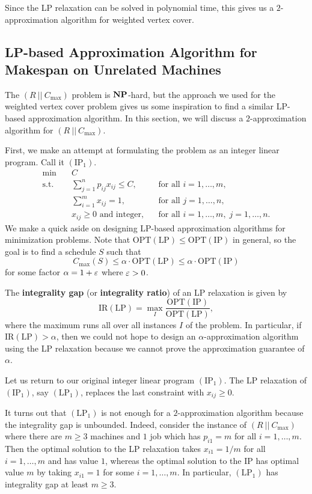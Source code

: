 Since the LP relaxation can be solved in polynomial time, this gives us a 
$2$-approximation algorithm for weighted vertex cover. 

\subsection{LP-based Approximation Algorithm for Makespan on Unrelated Machines}
\label{subsec:10.2}
The $(R~||~C_{\max})$ problem is $\operatorname{\textbf{NP}}$-hard, but the approach we used for the 
weighted vertex cover problem gives us some inspiration to find a similar 
LP-based approximation algorithm. In this section, we will discuss a 
$2$-approximation algorithm for $(R~||~C_{\max})$. 

First, we make an attempt at formulating the problem as an integer linear program. 
Call it $(\text{IP}_1)$. 
\begin{align*}
    \min\quad & C \\ 
    \text{s.t.}\quad & \sum_{j=1}^n p_{ij} x_{ij} \leq C, && \text{for all } i = 1, \dots, m, \\ 
    & \sum_{i=1}^m x_{ij} = 1, && \text{for all } j = 1, \dots, n, \\ 
    & x_{ij} \geq 0 \text{ and integer}, && \text{for all } i = 1, \dots, m,\; j = 1, \dots, n. 
\end{align*}
We make a quick aside on designing LP-based approximation algorithms for 
minimization problems. Note that $\text{OPT}(\text{LP}) \leq 
\text{OPT}(\text{IP})$ in general, so the goal is to find a schedule 
$S$ such that 
\[ C_{\max}(S) \leq \alpha \cdot \text{OPT}(\text{LP}) \leq 
\alpha \cdot \text{OPT}(\text{IP}) \] 
for some factor $\alpha = 1 + \varepsilon$ where $\varepsilon > 0$. 

The {\bf integrality gap} (or {\bf integrality ratio}) of an LP relaxation is 
given by 
\[ \text{IR}(\text{LP}) = \max_I
\frac{\text{OPT}(\text{IP})}{\text{OPT}(\text{LP})}, \] 
where the maximum runs all over all instances $I$ of the problem. In particular, 
if $\text{IR}(\text{LP}) > \alpha$, then we could not hope to design an 
$\alpha$-approximation algorithm using the LP relaxation because we 
cannot prove the approximation guarantee of $\alpha$. 

Let us return to our original integer linear program $(\text{IP}_1)$. 
The LP relaxation of $(\text{IP}_1)$, say $(\text{LP}_1)$, replaces the 
last constraint with $x_{ij} \geq 0$.

It turns out that $(\text{LP}_1)$ is not enough for a $2$-approximation 
algorithm because the integrality gap is unbounded. Indeed, consider the instance 
of $(R~||~C_{\max})$ where there are $m \geq 3$ machines and $1$ job 
which has $p_{i1} = m$ for all $i = 1, \dots, m$. Then the optimal solution 
to the LP relaxation takes $x_{i1} = 1/m$ for all $i = 1, \dots, m$ 
and has value $1$, whereas the optimal solution to the IP has optimal 
value $m$ by taking $x_{i1} = 1$ for some $i = 1, \dots, m$. In particular, 
$(\text{LP}_1)$ has integrality gap at least $m \geq 3$. 

